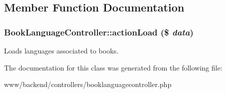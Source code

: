 \subsection{Member Function Documentation}
\hypertarget{classBookLanguageController_a6e15611d07adc945762254f82efeec8f}{
\subsubsection[{actionLoad}]{\setlength{\rightskip}{0pt plus 5cm}BookLanguageController::actionLoad (\$ {\em data})}}
\label{classBookLanguageController_a6e15611d07adc945762254f82efeec8f}
Loads languages associated to books. 

The documentation for this class was generated from the following file:\begin{DoxyCompactItemize}
\item 
www/backend/controllers/booklanguagecontroller.php\end{DoxyCompactItemize}
